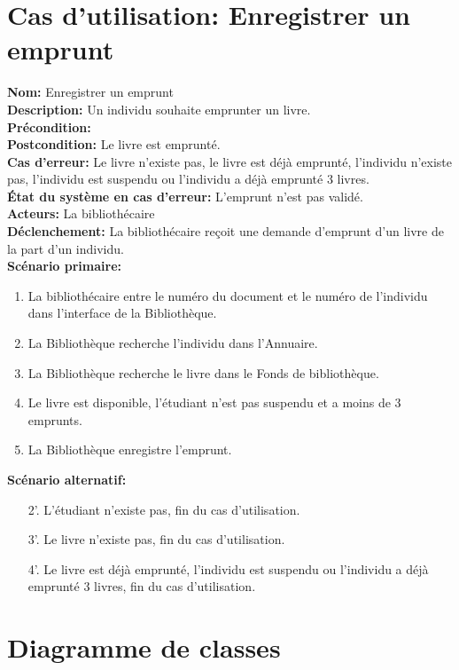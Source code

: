 \documentclass{article}
\begin{document}
\section{Cas d'utilisation: Enregistrer un emprunt}

\noindent\textbf{Nom:} Enregistrer un emprunt \\
\textbf{Description:} Un individu souhaite emprunter un livre.\\
\textbf{Précondition:} \\
\textbf{Postcondition:} Le livre est emprunté.\\
\textbf{Cas d'erreur:} Le livre n’existe pas, le livre est déjà emprunté, l’individu n’existe pas, l’individu est suspendu ou l’individu a déjà emprunté 3 livres.\\
\textbf{État du système en cas d'erreur:} L’emprunt n'est pas validé.\\
\textbf{Acteurs:} La bibliothécaire \\
\textbf{Déclenchement:} La bibliothécaire reçoit une demande d'emprunt d'un livre de la part d'un individu.\\
\textbf{Scénario primaire:}
\begin{enumerate}
	\item La bibliothécaire entre le numéro du document et le numéro de l'individu dans l'interface de la Bibliothèque.
	\item La Bibliothèque recherche l'individu dans l'Annuaire.
	\item La Bibliothèque recherche le livre dans le Fonds de bibliothèque.
	\item Le livre est disponible, l'étudiant n'est pas suspendu et a moins de 3 emprunts.
	\item La Bibliothèque enregistre l'emprunt.
\end{enumerate}

\noindent\textbf{Scénario alternatif:}
\begin{itemize}
	\item[2'.] L’étudiant n’existe pas, fin du cas d’utilisation.
	\item[3'.] Le livre n’existe pas, fin du cas d’utilisation.
	\item[4'.] Le livre est déjà emprunté, l’individu est suspendu ou l’individu a déjà emprunté 3 livres, fin du cas d’utilisation.
\end{itemize}


\section{Diagramme de classes}
\end{document}
